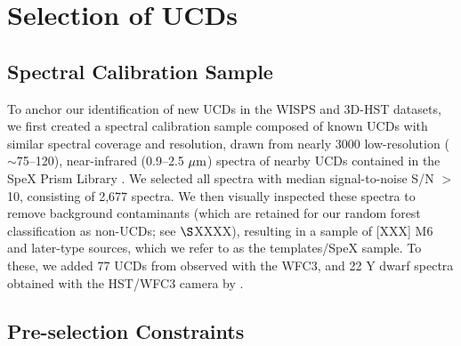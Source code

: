 \documentclass[manuscript]{aastex63}
\begin{document}



\section{Selection of UCDs}\label{sec:selectionp}

\subsection{Spectral Calibration Sample}\label{sec:trainset}

To anchor our identification of new UCDs in the WISPS and 3D-HST datasets, we first created a spectral calibration sample composed of known UCDs with similar spectral coverage and resolution, drawn from nearly 3000 low-resolution ($\sim$75--120), near-infrared (0.9--2.5 $\mbox{$\mu$m}$) spectra of nearby UCDs contained in the SpeX Prism Library  \citep[SPL\footnote{\url{https://cass.ucsd.edu/~ajb/browndwarfs/spexprism/library.html}};][]{2014arXiv1406.4887B}. 
We selected all spectra with median signal-to-noise S/N $>$ 10, consisting of 2,677 spectra. We then visually inspected these spectra to remove background contaminants (which are retained for our random forest classification as non-UCDs; see $\S$XXXX),
resulting in a sample of [XXX] M6 and later-type sources, which we refer to as the templates/SpeX sample. 
To these, we added 77 UCDs from \cite{Manjavacas2018} observed with the WFC3,
and 22 Y dwarf spectra obtained with the HST/WFC3 camera by \cite{Schneider2015}. 


\subsection{Pre-selection Constraints}
\end{document}
